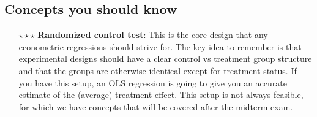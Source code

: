 \documentclass[12pt]{article}
\theoremstyle{definition}
\theoremstyle{property}
\theoremstyle{assumption}
\theoremstyle{example}
\theoremstyle{comment}
\begin{document}
\subsection{Concepts you should know}
\begin{itemize}
\item[$\star\star\star$] \textbf{Randomized control test}: This is the core design that any econometric regressions should strive for. The key idea to remember is that experimental designs should have a clear control vs treatment group structure and that the groups are otherwise identical except for treatment status. If you have this setup, an OLS regression is going to give you an accurate estimate of the (average) treatment effect. This setup is not always feasible, for which we have concepts that will be covered after the midterm exam. 


\end{itemize}
\end{document}
